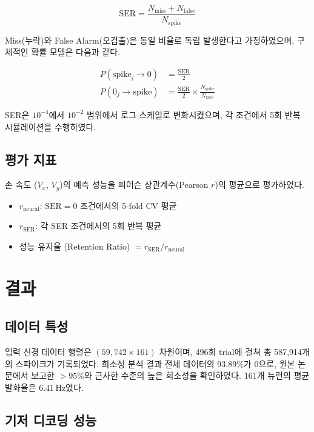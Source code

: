 \documentclass[12pt, a4paper]{article}
\begin{document}
\begin{equation}
  \text{SER} = \frac{N_{\text{miss}} + N_{\text{false}}}{N_{\text{spike}}}
  \label{eq:ser}
\end{equation}

Miss(누락)와 False Alarm(오검출)은 동일 비율로 독립 발생한다고 가정하였으며,
구체적인 확률 모델은 다음과 같다.

\begin{align}
  P(\text{spike}_i \rightarrow 0) &= \frac{\text{SER}}{2}
  \label{eq:miss} \\[4pt]
  P(0_j \rightarrow \text{spike}) &= \frac{\text{SER}}{2}
    \times \frac{N_{\text{spike}}}{N_{\text{zero}}}
  \label{eq:fa}
\end{align}

SER은 $10^{-4}$에서 $10^{-2}$ 범위에서 로그 스케일로 변화시켰으며,
각 조건에서 5회 반복 시뮬레이션을 수행하였다.

\subsection{평가 지표}

손 속도 ($V_x$, $V_y$)의 예측 성능을 피어슨 상관계수(Pearson $r$)의 평균으로 평가하였다.

\begin{itemize}
  \item $r_{\text{neural}}$: $\text{SER} = 0$ 조건에서의 5-fold CV 평균
  \item $r_{\text{SER}}$: 각 SER 조건에서의 5회 반복 평균
  \item 성능 유지율 (Retention Ratio) $= r_{\text{SER}} / r_{\text{neural}}$
\end{itemize}

\section{결과}

\subsection{데이터 특성}

입력 신경 데이터 행렬은 $(59{,}742 \times 161)$ 차원이며,
496회 trial에 걸쳐 총 587,914개의 스파이크가 기록되었다.
희소성 분석 결과 전체 데이터의 93.89\%가 0으로,
원본 논문에서 보고한 $>95\%$와 근사한 수준의 높은 희소성을 확인하였다.
161개 뉴런의 평균 발화율은 6.41\,Hz였다.

\subsection{기저 디코딩 성능}
\end{document}
